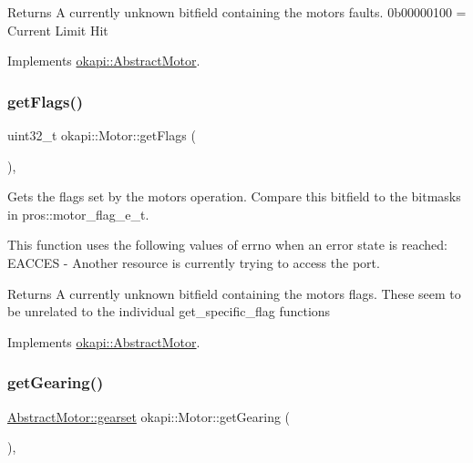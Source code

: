 \begin{DoxyReturn}{Returns}
A currently unknown bitfield containing the motor\textquotesingle{}s faults. 0b00000100 = Current Limit Hit 
\end{DoxyReturn}


Implements \mbox{\hyperlink{classokapi_1_1AbstractMotor_ae741463ec8de88c4f7ba854b5d6d7bce}{okapi\+::\+Abstract\+Motor}}.

\mbox{\label{classokapi_1_1Motor_acb0097ba7ac778674efaa2c0765f6f3f}} 
\subsubsection{\texorpdfstring{getFlags()}{getFlags()}}
{\footnotesize\ttfamily uint32\+\_\+t okapi\+::\+Motor\+::get\+Flags (\begin{DoxyParamCaption}{ }\end{DoxyParamCaption})\hspace{0.3cm}{\ttfamily [override]}, {\ttfamily [virtual]}}

Gets the flags set by the motor\textquotesingle{}s operation. Compare this bitfield to the bitmasks in pros\+::motor\+\_\+flag\+\_\+e\+\_\+t.

This function uses the following values of errno when an error state is reached\+: E\+A\+C\+C\+ES -\/ Another resource is currently trying to access the port.

\begin{DoxyReturn}{Returns}
A currently unknown bitfield containing the motor\textquotesingle{}s flags. These seem to be unrelated to the individual get\+\_\+specific\+\_\+flag functions 
\end{DoxyReturn}


Implements \mbox{\hyperlink{classokapi_1_1AbstractMotor_aaae44487bf20ac2e18b52ee57b7a06ad}{okapi\+::\+Abstract\+Motor}}.

\mbox{\label{classokapi_1_1Motor_a4dbe4aec1a4c6cb1cad659bada1ab8ed}} 
\subsubsection{\texorpdfstring{getGearing()}{getGearing()}}
{\footnotesize\ttfamily \mbox{\hyperlink{classokapi_1_1AbstractMotor_a88aaa6ea2fa10f5520a537bbf26774d5}{Abstract\+Motor\+::gearset}} okapi\+::\+Motor\+::get\+Gearing (\begin{DoxyParamCaption}{ }\end{DoxyParamCaption})\hspace{0.3cm}{\ttfamily [override]}, {\ttfamily [virtual]}}

